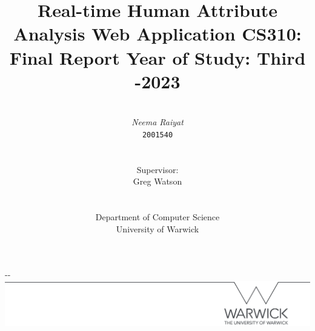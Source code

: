 \documentclass[12pt, a4paper]{article}
\title{\Huge{\textbf{Real-time Human Attribute Analysis Web Application}} \np CS310: Final Report \np \np \LARGE{Year of Study: Third \np 2022-2023}}
\author{
\\ \textit{\LARGE{Neema Raiyat}}\\ \texttt{2001540} %
\\
\\
\\ \Large{Supervisor:}
\\ \Large{Greg Watson}
\\
\\
\\ \Large{Department of Computer Science}
\\ \Large{University of Warwick}
\\
}
\date{\vspace{-5ex}}       %
\begin{document}
    
\maketitle
\thispagestyle{empty}	%

\begin{adjustwidth}{-\oddsidemargin-1in}{-\rightmargin}
   \centering
   \includegraphics[width=\paperwidth]{images/line.png}
\end{adjustwidth}

\clearpage
\pagestyle{empty}	%

\end{document}
